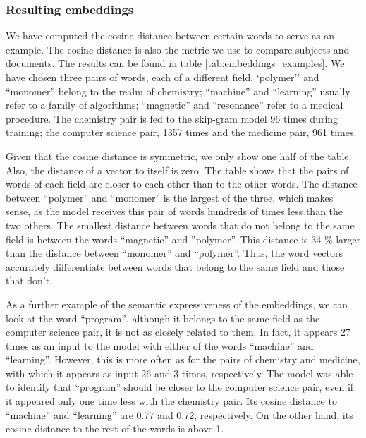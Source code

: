 \subsubsection{Resulting embeddings}

We have computed the cosine distance between certain words to serve as an example. The cosine distance is also the metric we use to compare subjects and documents. The results can be found in table \ref{tab:embeddings_examples}. We have chosen three pairs of words, each of a different field. `polymer'' and ``monomer'' belong to the realm of chemistry; ``machine'' and ``learning'' usually refer to a family of algorithms; ``magnetic'' and ``resonance'' refer to a medical procedure. The chemistry pair is fed to the skip-gram model 96 times during training; the computer science pair, 1357 times and the medicine pair, 961 times.

Given that the cosine distance is symmetric, we only show one half of the table. Also, the distance of a vector to itself is zero. The table shows that the pairs of words of each field are closer to each other than to the other words. The distance between ``polymer'' and ``monomer'' is the largest of the three, which makes sense, as the model receives this pair of words hundreds of times less than the two others. The smallest distance between words that do not belong to the same field is between the words ``magnetic'' and ''polymer''. This distance is 34 \% larger than the distance between ``monomer'' and ``polymer''. Thus, the word vectors accurately differentiate between words that belong to the same field and those that don't.

As a further example of the semantic expressiveness of the embeddings, we can look at the word ``program'', although it belongs to the same field as the computer science pair, it is not as closely related to them. In fact, it appears 27 times as an input to the model with either of the words ``machine'' and ``learning''. However, this is more often as for the pairs of chemistry and medicine, with which it appears as input 26 and 3 times, respectively. The model was able to identify that ``program'' should be closer to the computer science pair, even if it appeared only one time less with the chemistry pair. Its cosine distance to ``machine'' and ``learning'' are 0.77 and 0.72, respectively. On the other hand, its cosine distance to the rest of the words is above 1.

